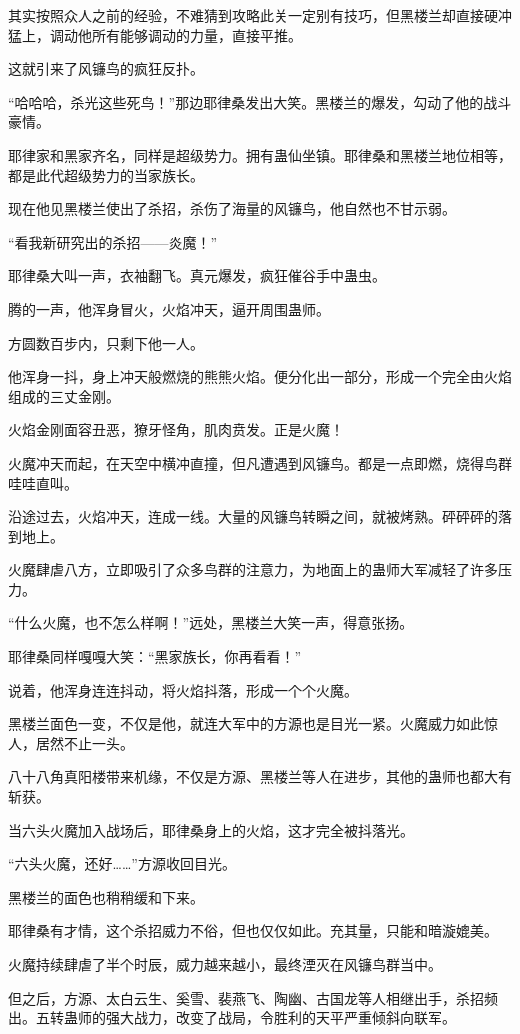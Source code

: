 \begin{this_body}
其实按照众人之前的经验，不难猜到攻略此关一定别有技巧，但黑楼兰却直接硬冲猛上，调动他所有能够调动的力量，直接平推。

这就引来了风镰鸟的疯狂反扑。

“哈哈哈，杀光这些死鸟！”那边耶律桑发出大笑。黑楼兰的爆发，勾动了他的战斗豪情。

耶律家和黑家齐名，同样是超级势力。拥有蛊仙坐镇。耶律桑和黑楼兰地位相等，都是此代超级势力的当家族长。

现在他见黑楼兰使出了杀招，杀伤了海量的风镰鸟，他自然也不甘示弱。

“看我新研究出的杀招——炎魔！”

耶律桑大叫一声，衣袖翻飞。真元爆发，疯狂催谷手中蛊虫。

腾的一声，他浑身冒火，火焰冲天，逼开周围蛊师。

方圆数百步内，只剩下他一人。

他浑身一抖，身上冲天般燃烧的熊熊火焰。便分化出一部分，形成一个完全由火焰组成的三丈金刚。

火焰金刚面容丑恶，獠牙怪角，肌肉贲发。正是火魔！

火魔冲天而起，在天空中横冲直撞，但凡遭遇到风镰鸟。都是一点即燃，烧得鸟群哇哇直叫。

沿途过去，火焰冲天，连成一线。大量的风镰鸟转瞬之间，就被烤熟。砰砰砰的落到地上。

火魔肆虐八方，立即吸引了众多鸟群的注意力，为地面上的蛊师大军减轻了许多压力。

“什么火魔，也不怎么样啊！”远处，黑楼兰大笑一声，得意张扬。

耶律桑同样嘎嘎大笑：“黑家族长，你再看看！”

说着，他浑身连连抖动，将火焰抖落，形成一个个火魔。

黑楼兰面色一变，不仅是他，就连大军中的方源也是目光一紧。火魔威力如此惊人，居然不止一头。

八十八角真阳楼带来机缘，不仅是方源、黑楼兰等人在进步，其他的蛊师也都大有斩获。

当六头火魔加入战场后，耶律桑身上的火焰，这才完全被抖落光。

“六头火魔，还好……”方源收回目光。

黑楼兰的面色也稍稍缓和下来。

耶律桑有才情，这个杀招威力不俗，但也仅仅如此。充其量，只能和暗漩媲美。

火魔持续肆虐了半个时辰，威力越来越小，最终湮灭在风镰鸟群当中。

但之后，方源、太白云生、奚雪、裴燕飞、陶幽、古国龙等人相继出手，杀招频出。五转蛊师的强大战力，改变了战局，令胜利的天平严重倾斜向联军。


\end{this_body}
